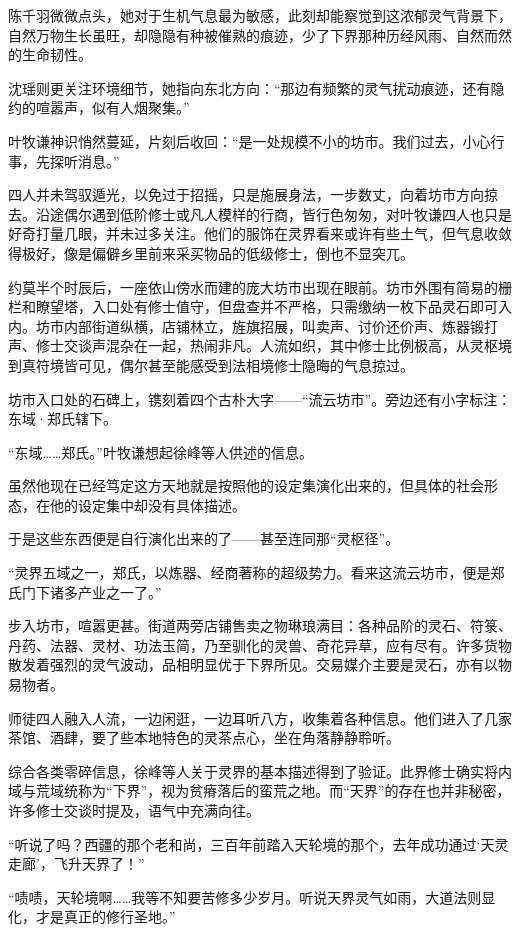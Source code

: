 陈千羽微微点头，她对于生机气息最为敏感，此刻却能察觉到这浓郁灵气背景下，自然万物生长虽旺，却隐隐有种被催熟的痕迹，少了下界那种历经风雨、自然而然的生命韧性。

沈瑶则更关注环境细节，她指向东北方向：“那边有频繁的灵气扰动痕迹，还有隐约的喧嚣声，似有人烟聚集。”

叶牧谦神识悄然蔓延，片刻后收回：“是一处规模不小的坊市。我们过去，小心行事，先探听消息。”

四人并未驾驭遁光，以免过于招摇，只是施展身法，一步数丈，向着坊市方向掠去。沿途偶尔遇到低阶修士或凡人模样的行商，皆行色匆匆，对叶牧谦四人也只是好奇打量几眼，并未过多关注。他们的服饰在灵界看来或许有些土气，但气息收敛得极好，像是偏僻乡里前来采买物品的低级修士，倒也不显突兀。

约莫半个时辰后，一座依山傍水而建的庞大坊市出现在眼前。坊市外围有简易的栅栏和瞭望塔，入口处有修士值守，但盘查并不严格，只需缴纳一枚下品灵石即可入内。坊市内部街道纵横，店铺林立，旌旗招展，叫卖声、讨价还价声、炼器锻打声、修士交谈声混杂在一起，热闹非凡。人流如织，其中修士比例极高，从灵枢境到真符境皆可见，偶尔甚至能感受到法相境修士隐晦的气息掠过。

坊市入口处的石碑上，镌刻着四个古朴大字——“流云坊市”。旁边还有小字标注：东域·郑氏辖下。

“东域……郑氏。”叶牧谦想起徐峰等人供述的信息。

虽然他现在已经笃定这方天地就是按照他的设定集演化出来的，但具体的社会形态，在他的设定集中却没有具体描述。

于是这些东西便是自行演化出来的了——甚至连同那“灵枢径”。

“灵界五域之一，郑氏，以炼器、经商著称的超级势力。看来这流云坊市，便是郑氏门下诸多产业之一了。”

步入坊市，喧嚣更甚。街道两旁店铺售卖之物琳琅满目：各种品阶的灵石、符箓、丹药、法器、灵材、功法玉简，乃至驯化的灵兽、奇花异草，应有尽有。许多货物散发着强烈的灵气波动，品相明显优于下界所见。交易媒介主要是灵石，亦有以物易物者。

师徒四人融入人流，一边闲逛，一边耳听八方，收集着各种信息。他们进入了几家茶馆、酒肆，要了些本地特色的灵茶点心，坐在角落静静聆听。

综合各类零碎信息，徐峰等人关于灵界的基本描述得到了验证。此界修士确实将内域与荒域统称为“下界”，视为贫瘠落后的蛮荒之地。而“天界”的存在也并非秘密，许多修士交谈时提及，语气中充满向往。

“听说了吗？西疆的那个老和尚，三百年前踏入天轮境的那个，去年成功通过‘天灵走廊’，飞升天界了！”

“啧啧，天轮境啊……我等不知要苦修多少岁月。听说天界灵气如雨，大道法则显化，才是真正的修行圣地。”

